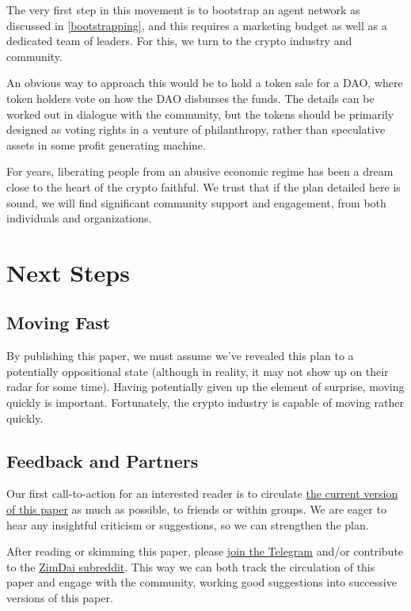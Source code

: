 \documentclass{article}
\begin{document}
The very first step in this movement is to bootstrap an agent network as discussed in \ref{bootstrapping}, and this requires a marketing budget as well as a dedicated team of leaders. For this, we turn to the crypto industry and community.

An obvious way to approach this would be to hold a token sale for a DAO, where token holders vote on how the DAO disburses the funds. The details can be worked out in dialogue with the community, but the tokens should be primarily designed as voting rights in a venture of philanthropy, rather than speculative assets in some profit generating machine.

For years, liberating people from an abusive economic regime has been a dream close to the heart of the crypto faithful. We trust that if the plan detailed here is sound, we will find significant community support and engagement, from both individuals and organizations.

\section{Next Steps} \label{next steps}

\subsection{Moving Fast} \label{moving fast}

By publishing this paper, we must assume we've revealed this plan to a potentially oppositional state (although in reality, it may not show up on their radar for some time). Having potentially given up the element of surprise, moving quickly is important. Fortunately, the crypto industry is capable of moving rather quickly.

\subsection{Feedback and Partners} \label{feedback and partners}

Our first call-to-action for an interested reader is to circulate \href{https://github.com/coinop-logan/ZimDai/blob/master/whitepaper.pdf}{the current version of this paper} as much as possible, to friends or within groups. We are eager to hear any insightful criticism or suggestions, so we can strengthen the plan.

After reading or skimming this paper, please \href{https://t.me/joinchat/EGlTfRYexSWmSy-C75Q2Xw}{join the Telegram} and/or contribute to the \href{https://www.reddit.com/r/ZimDai}{ZimDai subreddit}. This way we can both track the circulation of this paper and engage with the community, working good suggestions into successive versions of this paper.
\end{document}
